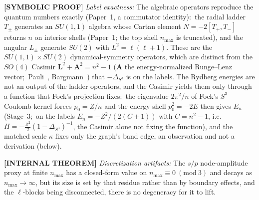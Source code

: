 \documentclass[aps,pra,twocolumn,superscriptaddress,longbibliography]{revtex4-2}
\newcommand{\gvc}[2]{#2}
\begin{document}
\textbf{[SYMBOLIC PROOF]} \textit{Label exactness:} \gvc{p1-ladder-exact}{The algebraic operators reproduce the quantum numbers exactly (Paper~1, a commutator identity):\ the radial ladder $T_\pm$ generates an $SU(1,1)$ algebra whose Cartan element $N = -2[T_+, T_-]$ returns $n$ on interior shells (Paper~1; the top shell $n_{\max}$ is truncated), and the angular $L_\pm$ generate $SU(2)$ with $L^2 = \ell(\ell+1)$}.  These are the $SU(1,1)\times SU(2)$ dynamical-symmetry operators, which are distinct from the $SO(4)$ Casimir $\mathbf{L}^2 + \mathbf{A}^2 = n^2 - 1$ ($\mathbf{A}$ the energy-normalized Runge--Lenz vector;\ Pauli~\cite{pauli1926}, Bargmann~\cite{bargmann1936}) that $-\Delta_{S^3}$ is on the labels.  The Rydberg energies are not an output of the ladder operators, and the Casimir yields them only through a function that Fock's projection fixes:\ the eigenvalue $2\pi^2/n$ of Fock's $S^3$ Coulomb kernel forces $p_0 = Z/n$ and the energy shell $p_0^2 = -2E$ then gives $E_n$ (Stage~3;\ on the labels $E_n = -Z^2/(2(C+1))$ with $C = n^2 - 1$, i.e.\ $H = -\tfrac{Z^2}{2}(1-\Delta_{S^3})^{-1}$, the Casimir alone not fixing the function), and the matched scale $\kappa$ fixes only the graph's band edge, an observation and not a derivation (below).

\textbf{[INTERNAL THEOREM]} \textit{Discretization artifacts:} The $s/p$ node-amplitude proxy at finite $n_{\max}$ has a closed-form value on $n_{\max} \equiv 0 \ (\mathrm{mod}\ 3)$ and decays as $n_{\max} \to \infty$, but its size is set by that residue rather than by boundary effects, and the $\ell$-blocks being disconnected, there is no degeneracy for it to lift.
\end{document}
